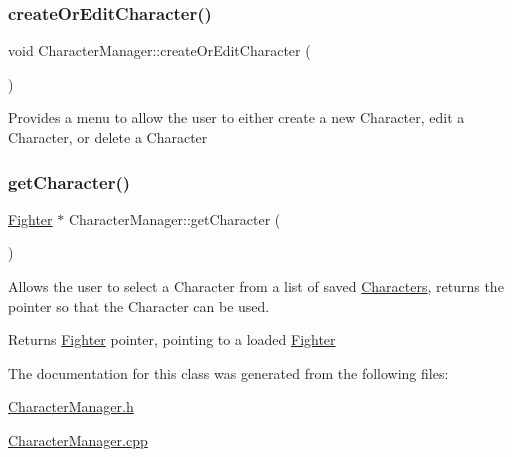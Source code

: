 \subsubsection{\texorpdfstring{create\+Or\+Edit\+Character()}{createOrEditCharacter()}}
{\footnotesize\ttfamily void Character\+Manager\+::create\+Or\+Edit\+Character (\begin{DoxyParamCaption}{ }\end{DoxyParamCaption})\hspace{0.3cm}{\ttfamily [static]}}

Provides a menu to allow the user to either create a new Character, edit a Character, or delete a Character \hypertarget{class_character_manager_a2b13fedd6c3913ae52a9be8051300276}{}\label{class_character_manager_a2b13fedd6c3913ae52a9be8051300276} 
\subsubsection{\texorpdfstring{get\+Character()}{getCharacter()}}
{\footnotesize\ttfamily \hyperlink{class_fighter}{Fighter} $\ast$ Character\+Manager\+::get\+Character (\begin{DoxyParamCaption}{ }\end{DoxyParamCaption})\hspace{0.3cm}{\ttfamily [static]}}

Allows the user to select a Character from a list of saved \hyperlink{class_characters}{Characters}, returns the pointer so that the Character can be used. \begin{DoxyReturn}{Returns}
\hyperlink{class_fighter}{Fighter} pointer, pointing to a loaded \hyperlink{class_fighter}{Fighter} 
\end{DoxyReturn}


The documentation for this class was generated from the following files\+:\begin{DoxyCompactItemize}
\item 
\hyperlink{_character_manager_8h}{Character\+Manager.\+h}\item 
\hyperlink{_character_manager_8cpp}{Character\+Manager.\+cpp}\end{DoxyCompactItemize}
